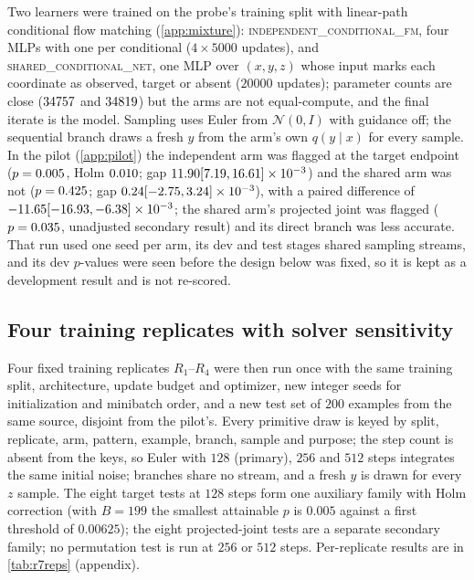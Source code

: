 \documentclass{article}
\theoremstyle{plain}
\theoremstyle{definition}
\theoremstyle{remark}
\begin{document}
Two learners were trained on the probe's training split with linear-path conditional flow matching (\cref{app:mixture}): \textsc{independent\_conditional\_fm}, four MLPs with one per conditional ($4\times5000$ updates), and \textsc{shared\_conditional\_net}, one MLP over $(x,y,z)$ whose input marks each coordinate as observed, target or absent ($20000$ updates); parameter counts are close ($34757$ and $34819$) but the arms are not equal-compute, and the final iterate is the model.
Sampling uses Euler from $\mathcal N(0,I)$ with guidance off; the sequential branch draws a fresh $y$ from the arm's own $q(y\mid x)$ for every sample.
In the pilot (\cref{app:pilot}) the independent arm was flagged at the target endpoint ($p=0.005$, Holm $0.010$; gap $11.90 [7.19, 16.61]\times10^{-3}$) and the shared arm was not ($p=0.425$; gap $0.24 [-2.75, 3.24]\times10^{-3}$), with a paired difference of $-11.65 [-16.93, -6.38]\times10^{-3}$; the shared arm's projected joint was flagged ($p=0.035$, unadjusted secondary result) and its direct branch was less accurate.
That run used one seed per arm, its dev and test stages shared sampling streams, and its dev $p$-values were seen before the design below was fixed, so it is kept as a development result and is not re-scored.

\subsection{Four training replicates with solver sensitivity}
\label{sec:exp-reps}
Four fixed training replicates $R_1$--$R_4$ were then run once with the same training split, architecture, update budget and optimizer, new integer seeds for initialization and minibatch order, and a new test set of $200$ examples from the same source, disjoint from the pilot's.
Every primitive draw is keyed by split, replicate, arm, pattern, example, branch, sample and purpose; the step count is absent from the keys, so Euler with $128$ (primary), $256$ and $512$ steps integrates the same initial noise; branches share no stream, and a fresh $y$ is drawn for every $z$ sample.
The eight target tests at $128$ steps form one auxiliary family with Holm correction (with $B=199$ the smallest attainable $p$ is $0.005$ against a first threshold of $0.00625$); the eight projected-joint tests are a separate secondary family; no permutation test is run at $256$ or $512$ steps. Per-replicate results are in \cref{tab:r7reps} (appendix).
\end{document}
